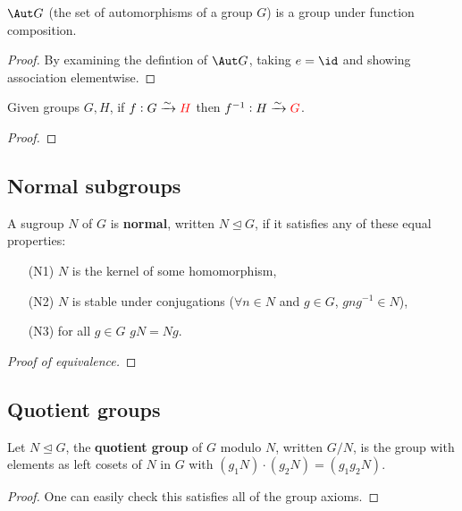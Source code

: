 \documentclass[../Year2.tex]{subfiles}
\begin{document}
\begin{theorem}
    $\Aut G$ (the set of automorphisms of a group $G$) is a group under function composition.
    \begin{proof}
        By examining the defintion of $\Aut G$, taking $e=\id$ and showing association elementwise.
    \end{proof}
\end{theorem}

\begin{theorem}
    Given groups $G,H$, if $f:G\xrightarrow{\sim}\textcolor{red}{H}$ then $f^{-1}:H\xrightarrow{\sim}\textcolor{red}{G}$.
\end{theorem}

\begin{proof}
    
\end{proof}

\subsection{Normal subgroups}

\begin{definition}
    A sugroup $N$ of $G$ is \textbf{normal}, written $N\unlhd G$, if it satisfies any of these equal properties: \begin{enumerate}
        \item[(N1)] $N$ is the kernel of some homomorphism,
        \item[(N2)] $N$ is stable under conjugations ($\forall n\in N$ and $g\in G$, $gng^{-1}\in N$),
        \item[(N3)] for all $g\in G$ $gN=Ng$.
    \end{enumerate}
    \begin{proof}[Proof of equivalence]
        
    \end{proof}
\end{definition}

\subsection{Quotient groups}

\begin{definition}
    Let $N\unlhd G$, the \textbf{quotient group} of $G$ modulo $N$, written $G/N$, is the group with elements as left cosets of $N$ in $G$ with $(g_1N)\cdot(g_2N) = (g_1g_2N)$.

    \begin{proof}
        One can easily check this satisfies all of the group axioms. 
    \end{proof}
\end{definition}
\end{document}
